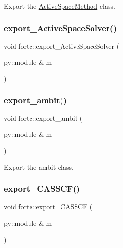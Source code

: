 Export the \mbox{\hyperlink{classforte_1_1_active_space_method}{Active\+Space\+Method}} class. 

\mbox{\label{namespaceforte_a29d21200178e2ad6086ac56ce72670da}} 
\subsubsection{\texorpdfstring{export\+\_\+\+Active\+Space\+Solver()}{export\_ActiveSpaceSolver()}}
{\footnotesize\ttfamily void forte\+::export\+\_\+\+Active\+Space\+Solver (\begin{DoxyParamCaption}\item[{py\+::module \&}]{m }\end{DoxyParamCaption})}

\mbox{\label{namespaceforte_a7332c10d053d305ad03f4c29c0560031}} 
\subsubsection{\texorpdfstring{export\+\_\+ambit()}{export\_ambit()}}
{\footnotesize\ttfamily void forte\+::export\+\_\+ambit (\begin{DoxyParamCaption}\item[{py\+::module \&}]{m }\end{DoxyParamCaption})}



Export the ambit class. 

\mbox{\label{namespaceforte_a959248dd4335ce72453abbe23a362bc3}} 
\subsubsection{\texorpdfstring{export\+\_\+\+C\+A\+S\+S\+C\+F()}{export\_CASSCF()}}
{\footnotesize\ttfamily void forte\+::export\+\_\+\+C\+A\+S\+S\+CF (\begin{DoxyParamCaption}\item[{py\+::module \&}]{m }\end{DoxyParamCaption})}

